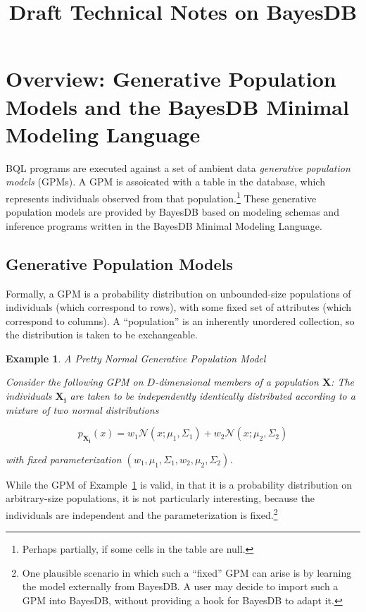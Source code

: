 \documentclass[10pt,letterpaper]{article}
\title{Draft Technical Notes on BayesDB}
\newtheorem{example}{Example}[section]
\begin{document}
\maketitle

\section{Overview: Generative Population Models and the BayesDB Minimal Modeling Language}
\label{sec:overview}

BQL programs are executed against a set of ambient data
\textit{generative population models} (GPMs).  A GPM is assoicated
with a table in the database, which represents individuals observed
from that population.\footnote{Perhaps partially, if some cells in the
  table are null.} These generative population models are provided by
BayesDB based on modeling schemas and inference programs written in
the BayesDB Minimal Modeling Language.

\subsection{Generative Population Models}

Formally, a GPM is a probability distribution on unbounded-size
populations of individuals (which correspond to rows), with some fixed
set of attributes (which correspond to columns). A ``population'' is
an inherently unordered collection, so the distribution is taken to be
exchangeable.

\begin{example} \label{ex:normal_gpm} A Pretty Normal Generative Population
Model

Consider the following GPM on $D$-dimensional members of
a population $\mathbf{X}$: The individuals $\mathbf{X_i}$ are taken to
be independently identically distributed according to a mixture of two
normal distributions

\[ p_\mathbf{X_i}(x) = w_1\mathcal{N}(x;\mu_1,\Sigma_1) + w_2\mathcal{N}(x;\mu_2,\Sigma_2) \]

with fixed parameterization $(w_1, \mu_1, \Sigma_1, w_2, \mu_2, \Sigma_2)$.
\end{example}

While the GPM of Example~\ref{ex:normal_gpm} is valid, in that it is a
probability distribution on arbitrary-size populations, it is not
particularly interesting, because the individuals are independent and
the parameterization is fixed.\footnote{One plausible scenario in
  which such a ``fixed'' GPM can arise is by learning the model
  externally from BayesDB.  A user may decide to import such a GPM
  into BayesDB, without providing a hook for BayesDB to adapt it.}
\end{document}
